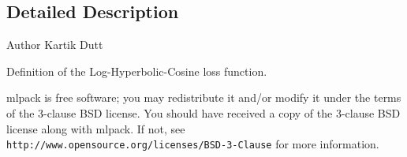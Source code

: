 \subsection{Detailed Description}
\begin{DoxyAuthor}{Author}
Kartik Dutt
\end{DoxyAuthor}
Definition of the Log-\/\+Hyperbolic-\/\+Cosine loss function.

mlpack is free software; you may redistribute it and/or modify it under the terms of the 3-\/clause B\+SD license. You should have received a copy of the 3-\/clause B\+SD license along with mlpack. If not, see {\tt http\+://www.\+opensource.\+org/licenses/\+B\+S\+D-\/3-\/\+Clause} for more information. 